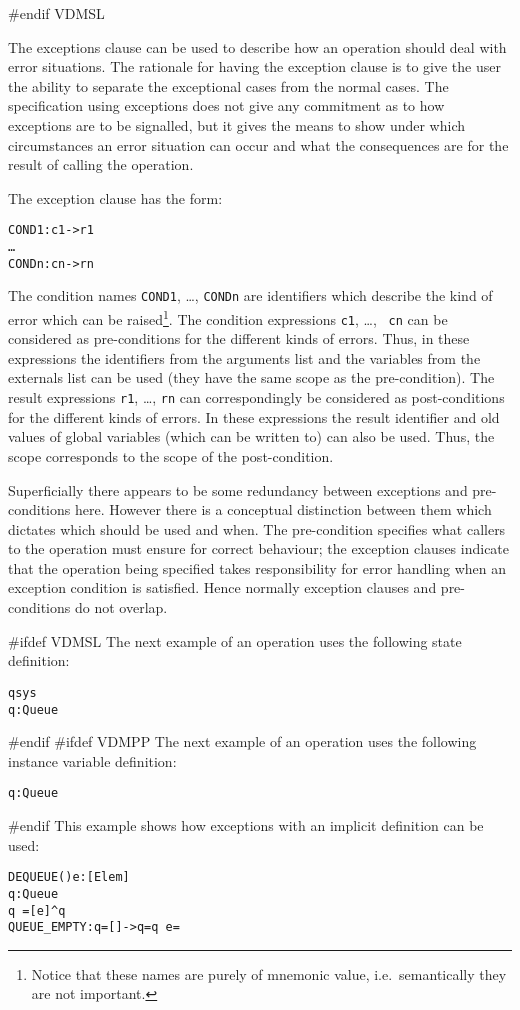 \documentclass[\pformat,12pt]{article}
\begin{document}
\begin{description}
\vspace{2ex}

#endif VDMSL

The exceptions clause can be used to describe how an operation should
deal with error situations. The rationale for having the exception
clause is to give the user the ability to separate the exceptional
cases from the normal cases. The specification using exceptions does
not give any commitment as to how exceptions are to be signalled, but
it gives the means to show under which circumstances an error
situation can occur and what the consequences are for the result of
calling the operation.

The exception clause has the form:
\begin{alltt}
    COND1: c1 -> r1
       \ldots
       CONDn: cn -> rn
\end{alltt}
The condition names {\tt COND1}, \ldots, {\tt CONDn} are identifiers
which describe the kind of error which can be raised\footnote{Notice
that these names are purely of mnemonic value, i.e.\ semantically they
are not important.}. The condition expressions {\tt c1}, \ldots, {\tt
cn} can be considered as pre-conditions for the different kinds of
errors. Thus, in these expressions the identifiers from the arguments
list and the variables from the externals list can be used (they have
the same scope as the pre-condition). The result expressions {\tt r1},
\ldots, {\tt rn} can correspondingly be considered as post-conditions
for the different kinds of errors. In these expressions the result
identifier and old values of global variables (which can be written
to) can also be used. Thus, the scope corresponds to the scope of the
post-condition.

Superficially there appears to be some redundancy between exceptions
and pre-conditions here. However there is a conceptual distinction
between them which dictates which should be used and when. The
pre-condition specifies what callers  to the operation must ensure for
correct behaviour; the exception clauses indicate that the operation
being specified takes responsibility for error handling when an
exception condition is satisfied. Hence normally exception clauses and
pre-conditions do not overlap.

#ifdef VDMSL
The next example of an operation uses the following state definition:
\begin{alltt}
   qsys 
    q : Queue
\end{alltt}    
#endif
#ifdef VDMPP
The next example of an operation uses the following instance variable definition:
\begin{alltt}
    q : Queue
\end{alltt}    
#endif
This example shows how exceptions with an implicit definition can be used:
\begin{alltt}
  DEQUEUE() e: [Elem]
    q : Queue
   q~ = [e] ^ q
   QUEUE_EMPTY: q = [] -> q = q~  e = 
\end{alltt}


\end{description}
\end{document}
